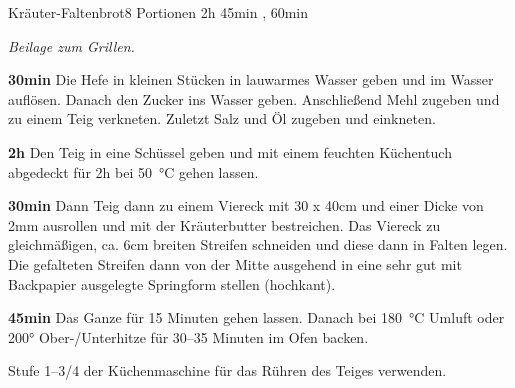 \documentclass[../recipe-collections/cooking.tex]{subfiles}
\begin{document}
\begin{recipe}{Kräuter-Faltenbrot}{8 Portionen }{2h 45min , 60min }

  \freeform{}\textit{Beilage zum Grillen.}


  \textbf{30min}
  Die Hefe in kleinen Stücken in lauwarmes Wasser geben und im Wasser auflösen.
  Danach den Zucker ins Wasser geben.
  Anschließend Mehl zugeben und zu einem Teig verkneten.
  Zuletzt Salz und Öl zugeben und einkneten.

  \newstep{}\textbf{2h}
  Den Teig in eine Schüssel geben und mit einem feuchten Küchentuch abgedeckt für 2h bei 50 °C gehen lassen.


  \textbf{30min}
  Dann Teig dann zu einem Viereck mit 30 x 40cm und einer Dicke von 2mm ausrollen und mit der Kräuterbutter bestreichen.
  Das Viereck zu gleichmäßigen, ca. 6cm breiten Streifen schneiden und diese dann in Falten legen.
  Die gefalteten Streifen dann von der Mitte ausgehend in eine sehr gut mit Backpapier ausgelegte Springform stellen (hochkant).

  \newstep{}\textbf{45min}
  Das Ganze für 15 Minuten gehen lassen.
  Danach bei 180 °C Umluft oder 200° Ober-/Unterhitze für 30--35 Minuten im Ofen backen.

  \freeform{}\hrulefill{}

  \freeform{}
  Stufe 1–3/4 der Küchenmaschine für das Rühren des Teiges verwenden.

\end{recipe}
\end{document}

